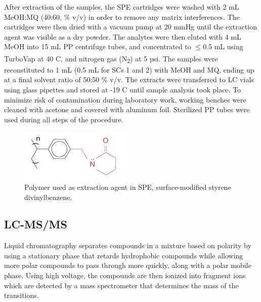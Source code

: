 After extraction of the samples, the SPE cartridges were washed with 2 mL MeOH:\acrshort{MQ} (40:60, \% v/v) in order to remove any matrix interferences. The cartridges were then dried with a vacuum pump at 20 mmHg until the extraction agent was visible as a dry powder. The analytes were then eluted with 4 mL MeOH into 15 mL PP centrifuge tubes, and concentrated to $\le$0.5 mL using TurboVap\textsuperscript{\textregistered} at 40 \textdegree C, and nitrogen gas (N\textsubscript{2}) at 5 psi. The samples were reconstituted to 1 mL (0.5 mL for SCs 1 and 2) with MeOH and MQ, ending up at a final solvent ratio of 50:50 \% v/v. The extracts were transferred to LC vials using glass pipettes and stored at -19 \textdegree C until sample analysis took place. To minimize risk of contamination during laboratory work, working benches were cleaned with acetone and covered with aluminum foil. Sterilized PP tubes were used during all steps of the procedure.

\begin{figure}
    \centering
    \includegraphics{Bilder/SPE_LCMS/mg_spe_strata-x.jpg}
    \caption{Polymer used as extraction agent in SPE, surface-modified styrene divinylbenzene.}
    \label{fig:StatPhase}
\end{figure}

\subsection{LC-MS/MS \label{sec:LCMS}}
Liquid chromatography separates compounds in a mixture based on polarity by using a stationary phase that retards hydrophobic compounds while allowing more polar compounds to pass through more quickly, along with a polar mobile phase. Using high voltage, the compounds are then ionized into fragment ions which are detected by a mass spectrometer that determines the mass of the transitions. 

